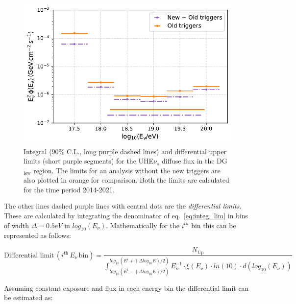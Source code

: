 \begin{figure}[t!]
  \centering
  \includegraphics[width=14.5cm]{thesis_figures/ExpLimits/Integ_DiffLimit_comp_new_sim_optim.pdf}
  \caption{Integral (90\% C.L., long purple dashed lines) and differential upper limits (short purple segments) for the UHE$\nu_s$ diffuse flux in the DG$\mathrm{_{\text{low}}}$ region. The limits for an analysis without the new triggers are also plotted in orange for comparison. Both the limits are calculated for the time period 2014-2021.}
  \label{fig:Limit_comp_1}
\end{figure}

The other lines dashed purple lines with central dots are the \textit{differential limits}. These are calculated by integrating the denominator of eq.~\ref{eq:integ_lim} in bins of width $\Delta = 0.5eV$ in $log_{10}(E_{\nu})$. Mathematically for the $i^{th}$ bin this can be represented as follows:

\begin{equation}
  \label{eq:diff_lim}
  \text{Differential limit} \, (i^{\text{th}} \, E_{\nu} \, \text{bin})  = \frac{N_{\text{Up}}}{\int_{log_{10}(E^i - (\Delta log_{10}E)/2)}^{log_{10}(E^i + (\Delta log_{10}E)/2)} E^{-1}_{\nu} \cdot \xi(E_{\nu}) \cdot ln(10) \cdot d(log_{10}(E_{\nu}))}
\end{equation}

Assuming constant exposure and flux in each energy bin the differential limit can be estimated as:

